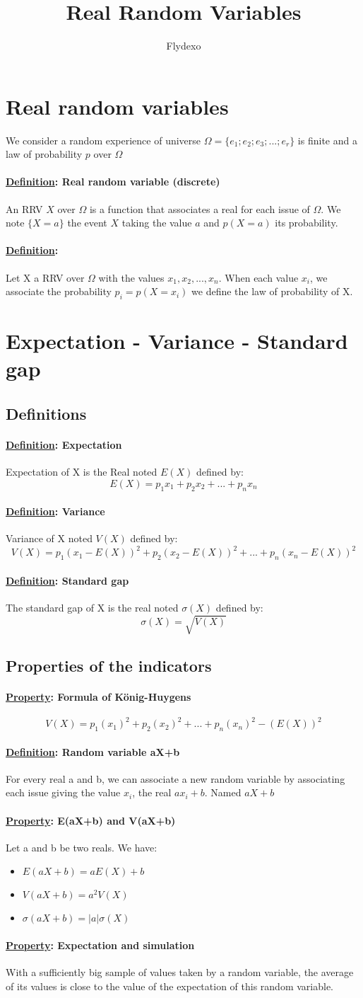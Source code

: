 \documentclass{article}
\title{Real Random Variables}
\author{Flydexo}
\newcommand{\definition}[1]{\paragraph*{\underline{Definition}: #1}}
\newcommand{\property}[1]{\paragraph*{\underline{Property}: #1}}
\begin{document}
\maketitle
\tableofcontents
\section{Real random variables}
We consider a random experience of universe $\Omega = \{e_1;e_2;e_3;...;e_r\}$ is finite and a law of probability $p$ over $\Omega$
\definition{Real random variable (discrete)}
An RRV $X$ over $\Omega$ is a function that associates a real for each issue of $\Omega$. We note $\{X=a\}$ the event $X$ taking the value $a$ and $p(X=a)$ its probability.
\definition{}
Let X a RRV over $\Omega$ with the values $x_1,x_2,...,x_n$. When each value $x_i$, we associate the probability $p_i = p(X=x_i)$ we define the law of probability of X.
\section{Expectation - Variance - Standard gap}
\subsection{Definitions}
\definition{Expectation}
Expectation of X is the Real noted $E(X)$ defined by: $$E(X) = p_1x_1+p_2x_2+...+p_nx_n$$
\definition{Variance}
Variance of X noted $V(X)$ defined by: $$V(X) = p_1(x_1-E(X))^2 + p_2(x_2-E(X))^2 + ... + p_n(x_n-E(X))^2$$
\definition{Standard gap}
The standard gap of X is the real noted $\sigma(X)$ defined by: $$\sigma(X) = \sqrt{V(X)}$$
\subsection{Properties of the indicators}
\property{Formula of König-Huygens}
$$V(X) = p_1(x_1)^2 + p_2(x_2)^2 + ... + p_n(x_n)^2 - (E(X))^2$$
\definition{Random variable aX+b}
For every real a and b, we can associate a new random variable by associating each issue giving the value $x_i$, the real $ax_i+b$. Named $aX+b$
\property{E(aX+b) and V(aX+b)}
Let a and b be two reals. We have:
\begin{itemize}
    \item $E(aX+b) = aE(X)+b$
    \item $V(aX+b) = a^2V(X)$
    \item $\sigma(aX+b) = |a|\sigma(X)$
\end{itemize}
\property{Expectation and simulation}
With a sufficiently big sample of values taken by a random variable, the average of its values is close to the value of the expectation of this random variable.
\end{document}
